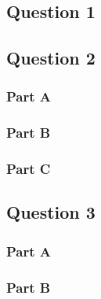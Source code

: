 \subsection{Question 1}

\newpage
\subsection{Question 2}
\subsubsection{Part A}
\subsubsection{Part B}
\subsubsection{Part C}

\newpage
\subsection{Question 3}
\subsubsection{Part A}
\subsubsection{Part B}


%
